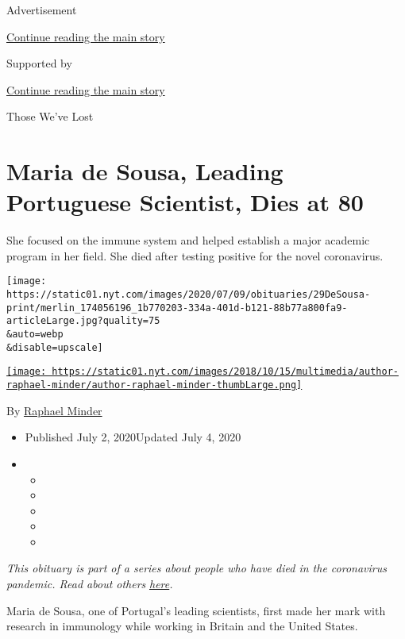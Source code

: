 Advertisement

\protect\hyperlink{after-top}{Continue reading the main story}

Supported by

\protect\hyperlink{after-sponsor}{Continue reading the main story}

Those We've Lost

\hypertarget{maria-de-sousa-leading-portuguese-scientist-dies-at-80}{%
\section{Maria de Sousa, Leading Portuguese Scientist, Dies at
80}\label{maria-de-sousa-leading-portuguese-scientist-dies-at-80}}

She focused on the immune system and helped establish a major academic
program in her field. She died after testing positive for the novel
coronavirus.

\texttt{[image: https://static01.nyt.com/images/2020/07/09/obituaries/29DeSousa-print/merlin\_174056196\_1b770203-334a-401d-b121-88b77a800fa9-articleLarge.jpg?quality=75\\\&auto=webp\\\&disable=upscale]}

\href{https://www.nytimes.com/by/raphael-minder}{\texttt{[image: https://static01.nyt.com/images/2018/10/15/multimedia/author-raphael-minder/author-raphael-minder-thumbLarge.png]}}

By \href{https://www.nytimes.com/by/raphael-minder}{Raphael Minder}

\begin{itemize}
\item
  Published July 2, 2020Updated July 4, 2020
\item
  \begin{itemize}
  \item
  \item
  \item
  \item
  \item
  \end{itemize}
\end{itemize}

\emph{This obituary is part of a series about people who have died in
the coronavirus pandemic. Read about others}
\href{https://www.nytimes.com/interactive/2020/obituaries/people-died-coronavirus-obituaries.html}{\emph{here}}\emph{.}

Maria de Sousa, one of Portugal's leading scientists, first made her
mark with research in immunology while working in Britain and the United
States.

